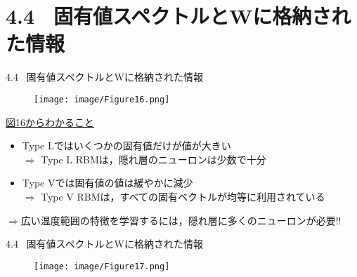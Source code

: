 \documentclass[dvipdfmx,8pt]{beamer}
\begin{document}
\section{4.4 \ 固有値スペクトルとWに格納された情報}
\begin{frame}[t]{4.4 \ 固有値スペクトルとWに格納された情報}
  \begin{figure}
     \begin{center}
         \texttt{[image: image/Figure16.png]}
     \end{center}
  \end{figure}
  \underline{図16からわかること}
  \vspace{0.2cm}
  \begin{itemize}
    \item Type Lではいくつかの固有値だけが値が大きい\\
    \vspace{0.2cm}
    $\Rightarrow$ Type L RBMは，隠れ層のニューロンは少数で十分
    \item Type Vでは固有値の値は緩やかに減少\\
    \vspace{0.2cm}
    $\Rightarrow$ Type V RBMは，すべての固有ベクトルが均等に利用されている
  \end{itemize}
  \vspace{0.2cm}
  $\Rightarrow$広い温度範囲の特徴を学習するには，隠れ層に多くのニューロンが必要!!
\end{frame}

\begin{frame}[t]{4.4 \ 固有値スペクトルとWに格納された情報}
  \begin{figure}
     \begin{center}
         \texttt{[image: image/Figure17.png]}
     \end{center}
  \end{figure}
\end{frame}
\end{document}
